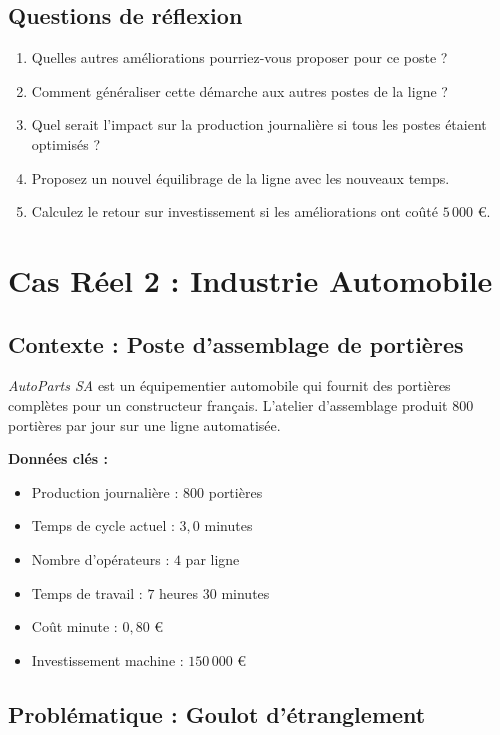 \documentclass[a4paper,12pt]{article}
\begin{document}
\subsection{Questions de réflexion}

\begin{enumerate}
    \item Quelles autres améliorations pourriez-vous proposer pour ce poste ?
    \item Comment généraliser cette démarche aux autres postes de la ligne ?
    \item Quel serait l'impact sur la production journalière si tous les postes étaient optimisés ?
    \item Proposez un nouvel équilibrage de la ligne avec les nouveaux temps.
    \item Calculez le retour sur investissement si les améliorations ont coûté $5\,000$ €.
\end{enumerate}

\section{Cas Réel 2 : Industrie Automobile}

\subsection{Contexte : Poste d'assemblage de portières}

\textit{AutoParts SA} est un équipementier automobile qui fournit des portières complètes pour un constructeur français. L'atelier d'assemblage produit $800$ portières par jour sur une ligne automatisée.

\textbf{Données clés :}
\begin{itemize}
    \item Production journalière : $800$ portières
    \item Temps de cycle actuel : $3,0$ minutes
    \item Nombre d'opérateurs : $4$ par ligne
    \item Temps de travail : $7$ heures $30$ minutes
    \item Coût minute : $0,80$ €
    \item Investissement machine : $150\,000$ €
\end{itemize}

\subsection{Problématique : Goulot d'étranglement}
\end{document}
